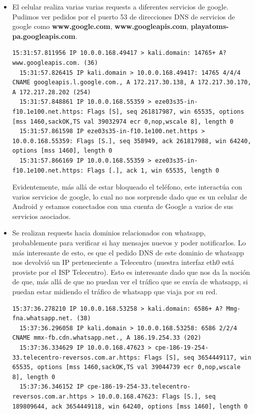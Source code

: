 \begin{itemize}

\item El celular realiza varias varias requests a diferentes servicios de google. Pudimos ver pedidos por el puerto 53 de direcciones DNS de 
servicios de google como \textbf{www.google.com}, \textbf{www.googleapis.com}, \textbf{playatoms-pa.googleapis.com}.

\begin{lstlisting}[style=base]
  15:31:57.811956 IP 10.0.0.168.49417 > kali.domain: 14765+ A? www.googleapis.com. (36)
  15:31:57.826415 IP kali.domain > 10.0.0.168.49417: 14765 4/4/4 CNAME googleapis.l.google.com., A 172.217.30.138, A 172.217.30.170, A 172.217.28.202 (254)
  15:31:57.848861 IP 10.0.0.168.55359 > eze03s35-in-f10.1e100.net.https: Flags [S], seq 261817987, win 65535, options [mss 1460,sackOK,TS val 39032974 ecr 0,nop,wscale 8], length 0
  15:31:57.861598 IP eze03s35-in-f10.1e100.net.https > 10.0.0.168.55359: Flags [S.], seq 358949, ack 261817988, win 64240, options [mss 1460], length 0
  15:31:57.866169 IP 10.0.0.168.55359 > eze03s35-in-f10.1e100.net.https: Flags [.], ack 1, win 65535, length 0
\end{lstlisting}

Evidentemente, más allá de estar bloqueado el teléfono, este interactúa con varios servicios de google, lo cual no nos sorprende dado 
que es un celular de Android y estamos conectados con una cuenta de Google a varios de sus servicios asociados.

\item Se realizan requests hacia dominios relacionados con whatsapp, probablemente para verificar si hay mensajes nuevos y poder notificarlos. 
Lo más interesante de esto, es que el pedido DNS de este dominio de whatsapp nos devolvió un IP perteneciente a Telecentro (nuestra interfaz 
eth0 está proviste por el ISP Telecentro). Esto es interesante dado que nos da la noción de que, más allá de que no puedan ver el tráfico 
que se envía de whatsapp, si puedan estar midiendo el tráfico de whatsapp que viaja por su red.

\begin{lstlisting}[style=base]
  15:37:36.278210 IP 10.0.0.168.53258 > kali.domain: 6586+ A? Mmg-fna.whatsapp.net. (38)
  15:37:36.296058 IP kali.domain > 10.0.0.168.53258: 6586 2/2/4 CNAME mmx-fb.cdn.whatsapp.net., A 186.19.254.33 (202)
  15:37:36.334629 IP 10.0.0.168.47623 > cpe-186-19-254-33.telecentro-reversos.com.ar.https: Flags [S], seq 3654449117, win 65535, options [mss 1460,sackOK,TS val 39044739 ecr 0,nop,wscale 8], length 0
  15:37:36.346152 IP cpe-186-19-254-33.telecentro-reversos.com.ar.https > 10.0.0.168.47623: Flags [S.], seq 189809644, ack 3654449118, win 64240, options [mss 1460], length 0
\end{lstlisting}


\end{itemize}
